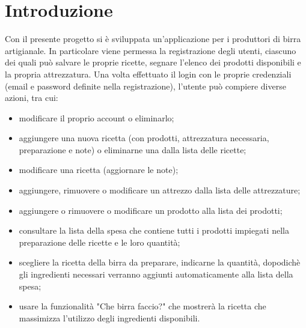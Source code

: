 \documentclass[a4paper, titlepage]{article}
\begin{document}
\section{Introduzione}
Con il presente progetto si è sviluppata un’applicazione per i produttori di birra artigianale. In particolare viene permessa la registrazione degli utenti, ciascuno dei quali può salvare le proprie ricette, segnare l’elenco dei prodotti disponibili e la propria attrezzatura. Una volta effettuato il login con le proprie credenziali (email e password definite nella registrazione), l’utente può compiere diverse azioni, tra cui:
\begin{itemize}
    \item modificare il proprio account o eliminarlo;
    \item aggiungere una nuova ricetta (con prodotti, attrezzatura necessaria, preparazione e note) o eliminarne una dalla lista delle ricette;
    \item modificare una ricetta (aggiornare le note);
    \item aggiungere, rimuovere o modificare un attrezzo dalla lista delle attrezzature;
    \item aggiungere o rimuovere o modificare un prodotto alla lista dei prodotti;
    \item consultare la lista della spesa che contiene tutti i prodotti impiegati nella preparazione delle ricette e le loro quantità;
    \item scegliere la ricetta della birra da preparare, indicarne la quantità, dopodichè gli ingredienti necessari verranno aggiunti automaticamente alla lista della spesa;
    \item usare la funzionalità "Che birra faccio?" che mostrerà la ricetta che massimizza l'utilizzo degli ingredienti disponibili.
\end{itemize}


\newpage
\end{document}
